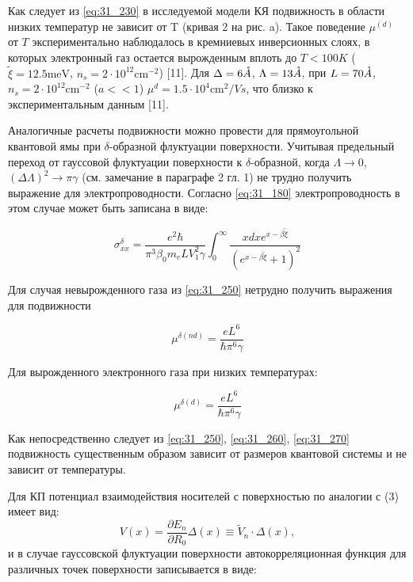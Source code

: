 Как следует из \eqref{eq:31_230} в исследуемой модели КЯ подвижность в области низких температур не зависит от T (кривая 2 на рис. a). Такое поведение $\mu ^{(d)} $ от $T$ экспериментально наблюдалось в кремниевых инверсионных слоях, в которых электронный газ остается вырожденным вплоть до $T<100 K$ ($\tilde{\xi }=12.5 \text{meV}$, $n_{s} =2\cdot 10^{12} \text{cm}^{-2} $) \cite{Stern1980}[11]. Для $\Delta =6\AA$, $\Lambda =13 \AA$, при $L=70 \AA$, $n_{s} =2\cdot 10^{12}  \text{cm}^{-2} $ ($a<<1$) $\mu ^{d} =1.5\cdot 10^{4} \text{cm}^{2} /{Vs}$, что близко к экспериментальным данным \cite{Stern1980}[11].

Аналогичные расчеты подвижности можно провести для прямоугольной квантовой ямы при $\delta $-образной флуктуации поверхности. Учитывая предельный переход от гауссовой флуктуации поверхности к $\delta $-образной, когда $\Lambda \to 0$, ${\left(\Delta \Lambda \right)}^2\to \pi \gamma $ (см. замечание в параграфе 2 гл. 1) не трудно получить выражение для электропроводности. Согласно \eqref{eq:31_180} электропроводность в этом случае может быть записана в виде:

\begin{equation} \label{eq:31_250}
{\sigma }^{\delta }_{xx}=\frac{e^2\hbar }{{\pi }^3{\beta }_0m_eLV^2_1\gamma }\int^{\infty }_0{\frac{xd xe^{x-\beta \widetilde{\xi }}}{{\left(e^{x-\beta \widetilde{\xi }}+1\right)}^2}}
\end{equation} 

\noindent Для случая невырожденного газа из \eqref{eq:31_250} нетрудно получить выражения для подвижности

\begin{equation} \label{eq:31_260}
{\mu }^{\delta \left(nd\right)}=\frac{eL^6}{\hbar {\pi }^6\gamma }
\end{equation}

\noindent Для вырожденного электронного газа при низких температурах:

\begin{equation} \label{eq:31_270}
{\mu }^{\delta \left(d\right)}=\frac{eL^6}{\hbar {\pi }^6\gamma }
\end{equation}


\noindent Как непосредственно следует из \eqref{eq:31_250}, \eqref{eq:31_260}, \eqref{eq:31_270} подвижность существенным образом зависит от размеров квантовой системы и не зависит от температуры.

Для КП потенциал взаимодействия носителей с поверхностью по аналогии с (3) имеет вид:
\[
V(x)=\frac{\partial E_{n} }{\partial R_{0} } \Delta (x)\equiv \tilde{V}_{n} \cdot \Delta (x),
\] 
и в случае гауссовской флуктуации поверхности автокорреляционная функция для различных точек поверхности записывается в виде:

